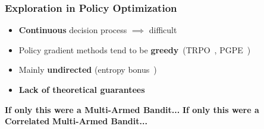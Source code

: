\documentclass[aspectratio=169, table]{beamer}
\newcommand{\enb}[1]{\textcolor{poliblue1}{\textbf{#1}}}
\newcommand{\eno}[1]{\textcolor{orangep}{\textbf{#1}}}
\begin{document}
\begin{frame} 
\frametitle{Exploration in Policy Optimization}
\begin{overlayarea}{\textwidth}{.75\textheight}
\begin{itemize}
	\setlength{\itemsep}{20pt}
	\item<1-4> \eno{Continuous} decision process $\implies$ difficult\vfill
	\item<2-4> Policy gradient methods tend to be \eno{greedy}~(\eg TRPO~\citep{schulman2015trust}, PGPE~\citep{sehnke2008policy})\vfill
	\item<3-4> Mainly \eno{undirected} (\eg entropy bonus~\citep{haarnoja2018soft})\vfill
	\item<4> \eno{Lack of theoretical guarantees}\vfill
\end{itemize}
\end{overlayarea}
\begin{overlayarea}{\textwidth}{.25\textheight}
\centering
\vspace{-40pt}
{\Large \enb{If only this were a Multi-Armed Bandit...}}
{\Large \enb{If only this were a} \eno{Correlated} \enb{Multi-Armed Bandit...}}
\end{overlayarea}
\end{frame}
\end{document}
